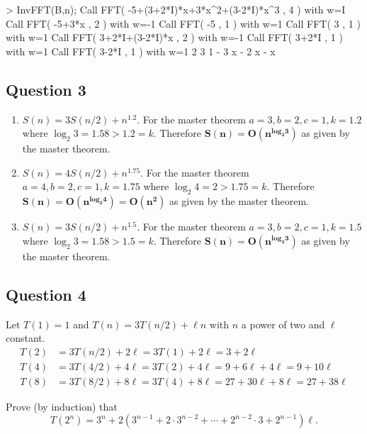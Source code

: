 \documentclass[12pt]{report}
\begin{document}
\begin{Output}
> InvFFT(B,n);
Call FFT( -5+(3+2*I)*x+3*x^2+(3-2*I)*x^3 , 4 ) with w=I
Call FFT( -5+3*x , 2 ) with w=-1
Call FFT( -5 , 1 ) with w=1
Call FFT( 3 , 1 ) with w=1
Call FFT( 3+2*I+(3-2*I)*x , 2 ) with w=-1
Call FFT( 3+2*I , 1 ) with w=1
Call FFT( 3-2*I , 1 ) with w=1
                                      2    3
                         1 - 3 x - 2 x  - x
\end{Output}

\subsection*{Question 3}
\begin{enumerate}
\item $S(n) = 3S(n/2) + n^{1.2}$. For the master theorem $a=3, b=2, c=1, k=1.2$ where $\log_2 3 = 1.58 > 1.2 = k$. Therefore $\mathbf{S(n) = O(n^{\textbf{log}_2 3})}$ as given by the master theorem.
\item $S(n) = 4S(n/2) + n^{1.75}$. For the master theorem $a=4, b=2, c=1, k=1.75$ where $\log_2 4 = 2 > 1.75 = k$. Therefore $\mathbf{S(n) = O(n^{\textbf{log}_2 4}) = O(n^2)}$ as given by the master theorem.
\item $S(n) = 3S(n/2) + n^{1.5}$. For the master theorem $a=3, b=2, c=1, k=1.5$ where $\log_2 3 = 1.58 > 1.5 = k$. Therefore $\mathbf{S(n) = O(n^{\textbf{log}_2 3})}$ as given by the master theorem.
\end{enumerate}


\subsection*{Question 4}

Let $T(1)=1$ and $T(n) = 3T(n/2) + \ell n$ with $n$ a power of two and $\ell$ constant.
\begin{align*}
T(2) &= 3T(n/2)+2 \ell = 3T(1) + 2 \ell = 3 + 2 \ell \\
T(4) &= 3T(4/2) + 4 \ell = 3T(2) + 4 \ell = 9 + 6 \ell + 4 \ell = 9 + 10 \ell \\
T(8) &= 3T(8/2) + 8 \ell = 3T(4)+8\ell = 27+30\ell+8\ell=27+38\ell
\end{align*}

Prove (by induction) that
\begin{equation}
T(2^n) = 3^n + 2(3^{n-1}+2 \cdot 3^{n-2} + \cdots + 2^{n-2} \cdot 3 + 2^{n-1}) \ell. \label{pr}
\end{equation}
\end{document}
